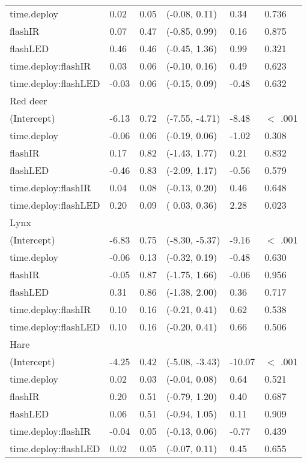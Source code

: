 \begin{table}[ht]
\begin{tabular}{llllll}
  time.deploy & 0.02 & 0.05 & (-0.08,  0.11) & 0.34 & 0.736  \\ 
  flashIR & 0.07 & 0.47 & (-0.85,  0.99) & 0.16 & 0.875  \\ 
  flashLED & 0.46 & 0.46 & (-0.45,  1.36) & 0.99 & 0.321  \\ 
  time.deploy:flashIR & 0.03 & 0.06 & (-0.10,  0.16) & 0.49 & 0.623  \\ 
  time.deploy:flashLED & -0.03 & 0.06 & (-0.15,  0.09) & -0.48 & 0.632  \\ 
  Red deer &  &  &  &  &        \\ 
  (Intercept) & -6.13 & 0.72 & (-7.55, -4.71) & -8.48 & $<$ .001 \\ 
  time.deploy & -0.06 & 0.06 & (-0.19,  0.06) & -1.02 & 0.308  \\ 
  flashIR & 0.17 & 0.82 & (-1.43,  1.77) & 0.21 & 0.832  \\ 
  flashLED & -0.46 & 0.83 & (-2.09,  1.17) & -0.56 & 0.579  \\ 
  time.deploy:flashIR & 0.04 & 0.08 & (-0.13,  0.20) & 0.46 & 0.648  \\ 
  time.deploy:flashLED & 0.20 & 0.09 & ( 0.03,  0.36) & 2.28 & 0.023  \\ 
  Lynx &  &  &  &  &        \\ 
  (Intercept) & -6.83 & 0.75 & (-8.30, -5.37) & -9.16 & $<$ .001 \\ 
  time.deploy & -0.06 & 0.13 & (-0.32,  0.19) & -0.48 & 0.630  \\ 
  flashIR & -0.05 & 0.87 & (-1.75,  1.66) & -0.06 & 0.956  \\ 
  flashLED & 0.31 & 0.86 & (-1.38,  2.00) & 0.36 & 0.717  \\ 
  time.deploy:flashIR & 0.10 & 0.16 & (-0.21,  0.41) & 0.62 & 0.538  \\ 
  time.deploy:flashLED & 0.10 & 0.16 & (-0.20,  0.41) & 0.66 & 0.506  \\ 
  Hare &  &  &  &  &        \\ 
  (Intercept) & -4.25 & 0.42 & (-5.08, -3.43) & -10.07 & $<$ .001 \\ 
  time.deploy & 0.02 & 0.03 & (-0.04,  0.08) & 0.64 & 0.521  \\ 
  flashIR & 0.20 & 0.51 & (-0.79,  1.20) & 0.40 & 0.687  \\ 
  flashLED & 0.06 & 0.51 & (-0.94,  1.05) & 0.11 & 0.909  \\ 
  time.deploy:flashIR & -0.04 & 0.05 & (-0.13,  0.06) & -0.77 & 0.439  \\ 
  time.deploy:flashLED & 0.02 & 0.05 & (-0.07,  0.11) & 0.45 & 0.655  \\ 

\end{tabular}
\end{table}
